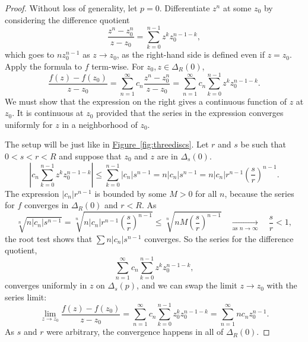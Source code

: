 \documentclass[12pt,openany]{book}
\newcommand{\sabs}[1]{\lvert {#1} \rvert}
\newcommand{\abs}[1]{\left\lvert {#1} \right\rvert}
\theoremstyle{plain}
\theoremstyle{remark}
\theoremstyle{definition}
\theoremstyle{exercise}
\theoremstyle{example}
\newcommand{\figureref}[1]{\hyperref[#1]{Figure~\ref*{#1}}}
\begin{document}
\begin{proof}
Without loss of generality, let $p=0$.
Differentiate $z^n$ at some $z_0$ by considering the difference
quotient
\begin{equation*}
\frac{z^n-z_0^n}{z-z_0}
=
\sum_{k=0}^{n-1}
z^k z_0^{n-1-k} ,
\end{equation*}
which goes to $n z_0^{n-1}$ as $z \to z_0$, as
the right-hand side is defined even if $z = z_0$.
Apply the formula to $f$
term-wise.  For $z_0,z \in \Delta_R(0)$,
\begin{equation*}
\frac{f(z) - f(z_0)}{z-z_0}
=
\sum_{n=1}^\infty c_n \frac{z^n-z_0^n}{z-z_0}
=
\sum_{n=1}^\infty c_n \sum_{k=0}^{n-1} z^k z_0^{n-1-k} .
\end{equation*}
We must show that the expression on the right gives a continuous function of $z$
at $z_0$.
It is continuous at $z_0$ provided that the series
in the expression converges uniformly for $z$ in a
neighborhood of $z_0$.

The setup will be just like in \figureref{fig:threediscs}.
Let $r$ and $s$ be such that $0 < s < r < R$ and suppose that $z_0$ and $z$ are
in $\Delta_s(0)$.
\begin{equation*}
\abs{c_n \sum_{k=0}^{n-1} z^k z_0^{n-1-k}}
\leq
\sum_{k=0}^{n-1} 
\sabs{c_n}
s^{n-1}
=
n
\sabs{c_n} s^{n-1}
=
n
\sabs{c_n} r^{n-1} {\left(\frac{s}{r}\right)}^{n-1} .
\end{equation*}
The expression
$\sabs{c_n} r^{n-1}$ is bounded by some $M > 0$ for all $n$,
because the series for $f$ converges
in $\Delta_R(0)$ and $r < R$.
As
\begin{equation*}
\sqrt[n]{
n \sabs{c_n} s^{n-1}
}
=
\sqrt[n]{
n \sabs{c_n} r^{n-1} {\left(\frac{s}{r}\right)}^{n-1}
}
\leq
\sqrt[n]{
n M {\left(\frac{s}{r}\right)}^{n-1}
}
\quad\underset{\text{as } n \to \infty}{\to}\quad
\frac{s}{r} < 1 ,
\end{equation*}
the root test shows that
$\sum n \sabs{c_n} s^{n-1}$
converges.
So the series for the difference quotient,
\begin{equation*}
\sum_{n=1}^\infty c_n \sum_{k=0}^{n-1} z^k z_0^{n-1-k} ,
\end{equation*}
converges uniformly in $z$ on $\Delta_s(p)$, and
we can swap the limit $z \to z_0$ with the series limit:
\begin{equation*}
\lim_{z \to z_0}
\frac{f(z)-f(z_0)}{z-z_0}
=
\sum_{n=1}^\infty c_n \sum_{k=0}^{n-1} z_0^k z_0^{n-1-k}
=
\sum_{n=1}^\infty n c_n z_0^{n-1} .
\end{equation*}
As $s$ and $r$ were arbitrary, the convergence happens in all of
$\Delta_R(0)$.
\end{proof}
\end{document}
